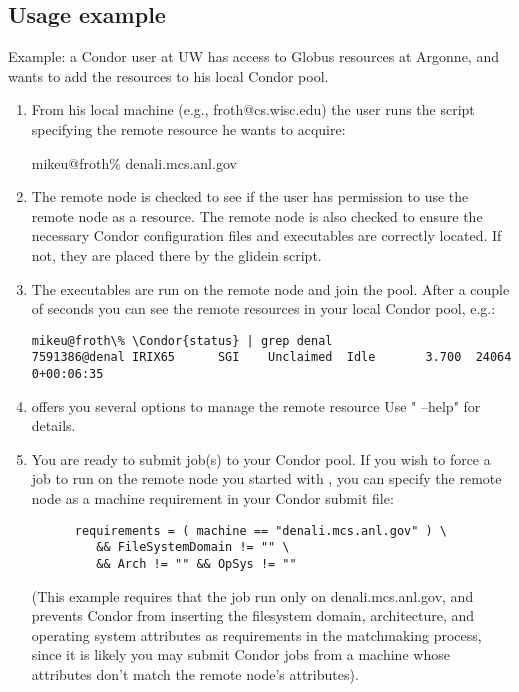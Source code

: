 \subsection{Usage example}
Example: a Condor user at UW has access to Globus resources at 
Argonne, and wants to add the resources to his local Condor pool.

\begin{enumerate}

\item From his local machine (e.g., froth@cs.wisc.edu) the user runs 
   the  script specifying the remote resource he wants 
   to acquire:

mikeu@froth\%  denali.mcs.anl.gov

\item The remote node is checked to see if the user has permission to
   use the remote node as a resource. The remote node is also checked
   to ensure the necessary Condor configuration files and executables
   are correctly located. If not, they are placed there by the glidein
   script.

\item The executables are run on the remote node and join the pool.
   After a couple of seconds you can see the remote resources in your 
   local Condor pool, e.g.:

\begin{verbatim}
mikeu@froth\% \Condor{status} | grep denal
7591386@denal IRIX65      SGI    Unclaimed  Idle       3.700  24064  0+00:06:35
\end{verbatim}

\item {} offers you several options to manage the remote resource
   Use " --help" for details.

\item You are ready to submit job(s) to your Condor pool. If you wish to force
   a job to run on the remote node you started with , you can
   specify the remote node as a machine requirement in your Condor submit
   file: 
\begin{verbatim}
      requirements = ( machine == "denali.mcs.anl.gov" ) \
         && FileSystemDomain != "" \
         && Arch != "" && OpSys != ""
\end{verbatim}
   (This example requires that the job run only on denali.mcs.anl.gov, and
   prevents Condor from inserting the filesystem domain, architecture, and 
   operating system attributes as requirements in the matchmaking process,
   since it is likely you may submit Condor jobs from a machine whose
   attributes don't match the remote node's attributes).

\end{enumerate}

